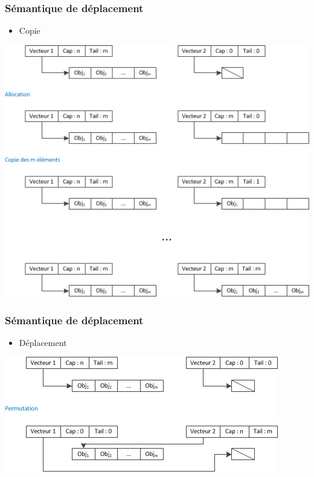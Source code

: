 \documentclass[C++.tex]{subfiles}
\begin{document}
\begin{frame}
	\frametitle{Sémantique de déplacement}
	\begin{itemize}
		\item Copie
	\end{itemize}

	\begin{center}
		\includegraphics[height=0.7\textheight]{input_src/copie.png}
	\end{center}
\end{frame}

\begin{frame}
	\frametitle{Sémantique de déplacement}
	\begin{itemize}
		\item Déplacement
	\end{itemize}

	\begin{center}
		\includegraphics[height=0.4\textheight]{input_src/deplacement.png}
	\end{center}
\end{frame}
\end{document}
